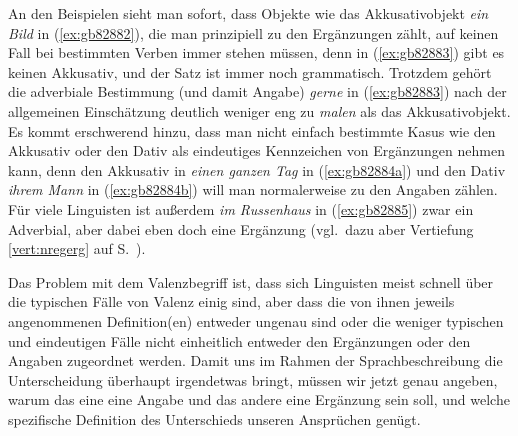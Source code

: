 \begin{exe}
  \ex\label{ex:gb82882u3}
  \begin{xlist}
  \end{xlist}
\end{exe}

An den Beispielen sieht man sofort, dass Objekte wie das Akkusativobjekt \textit{ein Bild} in (\ref{ex:gb82882}), die man prinzipiell zu den Ergänzungen zählt, auf keinen Fall bei bestimmten Verben immer stehen müssen, denn in (\ref{ex:gb82883}) gibt es keinen Akkusativ, und der Satz ist immer noch grammatisch.
Trotzdem gehört die adverbiale Bestimmung (und damit Angabe) \textit{gerne} in (\ref{ex:gb82883}) nach der allgemeinen Einschätzung deutlich weniger eng zu \textit{malen} als das Akkusativobjekt.
Es kommt erschwerend hinzu, dass man nicht einfach bestimmte Kasus wie den Akkusativ oder den Dativ als eindeutiges Kennzeichen von Ergänzungen nehmen kann, denn den Akkusativ in \textit{einen ganzen Tag} in (\ref{ex:gb82884a}) und den Dativ \textit{ihrem Mann} in (\ref{ex:gb82884b}) will man normalerweise zu den Angaben zählen.
Für viele Linguisten ist außerdem \textit{im Russenhaus} in (\ref{ex:gb82885}) zwar ein Adverbial, aber dabei eben doch eine Ergänzung (vgl.\ dazu aber Vertiefung \ref{vert:nregerg} auf S.~\pageref{vert:nregerg}).

\begin{exe}
  \ex\label{ex:gb82884} 
  \begin{xlist}
  \end{xlist}
\end{exe}

Das Problem mit dem Valenzbegriff ist, dass sich Linguisten meist schnell über die typischen Fälle von Valenz einig sind, aber dass die von ihnen jeweils angenommenen Definition(en) entweder ungenau sind oder die weniger typischen und eindeutigen Fälle nicht einheitlich entweder den Ergänzungen oder den Angaben zugeordnet werden.
Damit uns im Rahmen der Sprachbeschreibung die Unterscheidung überhaupt irgendetwas bringt, müssen wir jetzt genau angeben, warum das eine eine Angabe und das andere eine Ergänzung sein soll, und welche spezifische Definition des Unterschieds unseren Ansprüchen genügt.

